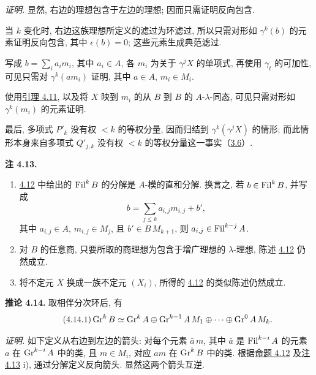 \emph{证明.} 显然, 右边的理想包含于左边的理想; 因而只需证明反向包含.

当 \(k\) 变化时, 右边这族理想所定义的滤过为环滤过, 所以只需对形如 \(\gamma^k(b)\) 的元素证明反向包含, 其中 \(\epsilon(b)=0\); 这些元素生成典范滤过.

写成 \(b=\sum_i a_i m_i\), 其中 \(a_i\in A\), 各 \(m_i\) 为关于 \(\gamma^jX\) 的单项式, 再使用 \(\gamma_t\) 的可加性, 可见只需对 \(\gamma^k(am_i)\) 证明, 其中 \(a\in A\), \(m_i\in M_i\).

使用\hyperlink{sga6.e05.lem.4-11}{引理 4.11}, 以及将 \(X\) 映到 \(m_i\) 的从 \(B\) 到 \(B\) 的 \(A\)-\(\lambda\)-同态, 可见只需对形如 \(\gamma^k(m_i)\) 的元素证明.

最后, 多项式 \(P'_k\) 没有权 \(<k\) 的等权分量, 因而归结到 \(\gamma^k(\gamma^jX)\) 的情形; 而此情形本身来自多项式 \(Q'_{j,k}\) 没有权 \(<k\) 的等权分量这一事实（\hyperlink{sga6.e05.para.3-6}{3.6}）.

\newpage
{}\textbf{注 4.13.}\nopagebreak[4]
\begin{enumerate}[label=\roman*)]
\item \hyperlink{sga6.e05.prop.4-12}{4.12} 中给出的 \(\operatorname{Fil}^kB\) 的分解是 \(A\)-模的直和分解. 换言之, 若 \(b\in\operatorname{Fil}^kB\), 并写成
\[
 b=\sum_{j\le k}a_{i,j}m_{i,j}+b',
\]
其中 \(a_{i,j}\in A\), \(m_{i,j}\in M_j\), 且 \(b'\in B\,M_{k+1}\), 则 \(a_{i,j}\in\operatorname{Fil}^{k-j}A\).
\item 对 \(B\) 的任意商, 只要所取的商理想为包含于增广理想的 \(\lambda\)-理想, 陈述 \hyperlink{sga6.e05.prop.4-12}{4.12} 仍然成立.
\item 将不定元 \(X\) 换成一族不定元 \((X_i)\), 所得的 \hyperlink{sga6.e05.prop.4-12}{4.12} 的类似陈述仍然成立.
\end{enumerate}

\textbf{推论 4.14.} 取相伴分次环后, 有
\begin{equation}\tag{4.14.1}
  \operatorname{Gr}^kB\simeq
  \operatorname{Gr}^kA\oplus \operatorname{Gr}^{k-1}A\,M_1\oplus\cdots\oplus\operatorname{Gr}^0A\,M_k.
\end{equation}

\emph{证明.} 如下定义从右边到左边的箭头: 对每个元素 \(\bar a\,m\), 其中 \(\bar a\) 是 \(\operatorname{Fil}^{k-i}A\) 的元素 \(a\) 在 \(\operatorname{Gr}^{k-i}A\) 中的类, 且 \(m\in M_i\), 对应 \(am\) 在 \(\operatorname{Gr}^kB\) 中的类. 根据\hyperlink{sga6.e05.prop.4-12}{命题 4.12} 及\hyperlink{sga6.e05.rem.4-13}{注 4.13} i), 通过分解定义反向箭头. 显然这两个箭头互逆.

